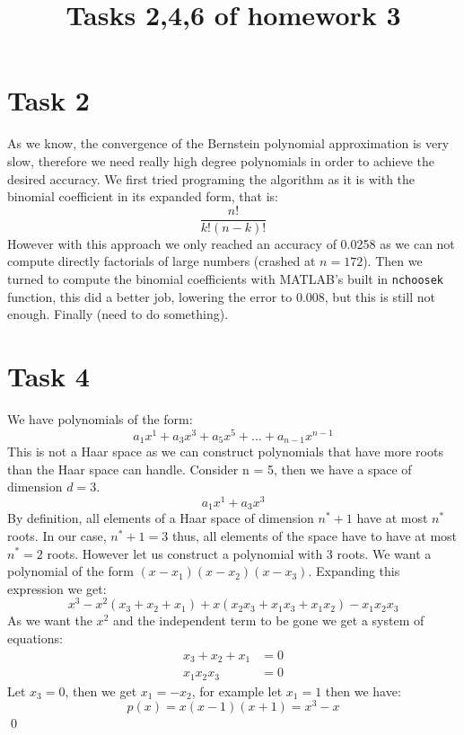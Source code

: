 \documentclass[a4paper, 11pt]{article}
\title{Tasks 2,4,6 of homework 3}
\author{}
\date{}
\begin{document}
\maketitle

\section*{Task 2}
As we know, the convergence of the Bernstein polynomial approximation is very slow, therefore we need really high degree polynomials in order to achieve the desired accuracy. We first tried programing the algorithm as it is with the binomial coefficient in its expanded form, that is:
\begin{equation*}
\frac{n!}{k!(n-k)!}
\end{equation*}
However with this approach we only reached an accuracy of 0.0258 as we can not compute directly factorials of large numbers (crashed at $n = 172$). Then we turned to compute the binomial coefficients with MATLAB's built in \texttt{nchoosek} function, this did a better job, lowering the error to 0.008, but this is still not enough. Finally (need to do something).

\section*{Task 4}
We have polynomials of the form:
\begin{equation*}
a_1x^1+a_3x^3+a_5x^5+\ldots+a_{n-1}x^{n-1}
\end{equation*}
This is not a Haar space as we can construct polynomials that have more roots than the Haar space can handle. Consider n = 5, then we have a space of dimension $d=3$.
\begin{equation*}
a_1x^1+a_3x^3
\end{equation*}
By definition, all elements of a Haar space of dimension $n^*+1$ have at most $n^*$ roots. In our case, $n^*+1 = 3$ thus, all elements of the space have to have at most $n^*=2$ roots. However let us construct a polynomial with 3 roots. We want a polynomial of the form $(x-x_1)(x-x_2)(x-x_3)$. Expanding this expression we get:
\begin{equation*}
x^3-x^2(x_3+x_2+x_1)+x(x_2x_3+x_1x_3+x_1x_2)-x_1x_2x_3
\end{equation*}
As we want the $x^2$ and the independent term to be gone we get a system of equations:
\begin{align*}
x_3+x_2+x_1 &= 0 \\
x_1x_2x_3 &= 0
\end{align*}
Let $x_3 = 0$, then we get $x_1 = -x_2$, for example let $x_1 = 1$ then we have:
\begin{equation*}
p(x) = x(x-1)(x+1) = x^3-x
\end{equation*}
\qed
\end{document}
